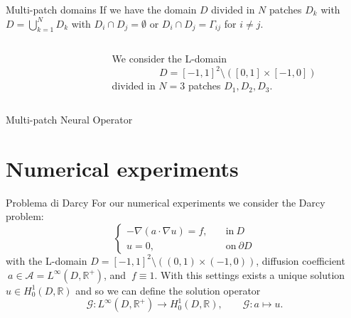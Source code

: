 \documentclass{beamer}
\newcommand{\numberset}{\mathbb}
\newcommand{\R}{\numberset{R}}
\begin{document}
\begin{frame}{Multi-patch domains}
	If we have the domain $D$ divided in $N$ patches $D_k$ with $D = \bigcup_{k=1}^{N} D_k$ with $D_i \cap D_j = \emptyset$ or $D_i \cap D_j = \Gamma_{ij}$ for $i \neq j$.
	\begin{columns}
		\begin{column}{0.5\textwidth}
			\begin{center}
			\end{center}
		\end{column}%
		\begin{column}{0.5\textwidth}
			We consider the L-domain 
			\[ D = [-1, 1]^2\setminus ([0,1]\times [-1,0]) \] 
			divided in $N=3$ patches $ D_1, D_2, D_3 $.
		\end{column}
	\end{columns}
\end{frame}


\begin{frame}{Multi-patch Neural Operator}

\end{frame}


\section{Numerical experiments}


\begin{frame}{Problema di Darcy}
	For our numerical experiments we consider the Darcy problem:
	\[ 	\begin{cases}
		- \nabla(a \cdot \nabla u) = f,\quad &  \mathrm{in}\ D\\
		u = 0, & \mathrm{on} \ \partial D
	\end{cases} \]
	with the L-domain $ D = [-1, 1]^2\setminus ((0,1)\times (-1,0)) $, diffusion coefficient $\ a \in \mathcal{A} = L^{\infty}(D, \R^+) $,  and $\ f \equiv 1 $. With this settings exists a unique solution $ u \in H^1_0(D, \R) $ and so we can define the solution operator 
	\[  \mathcal{G}: L^{\infty}(D, \R^+) \to H^1_0(D, \R), \qquad \mathcal{G}:a \mapsto u. \]
\end{frame}
\end{document}
